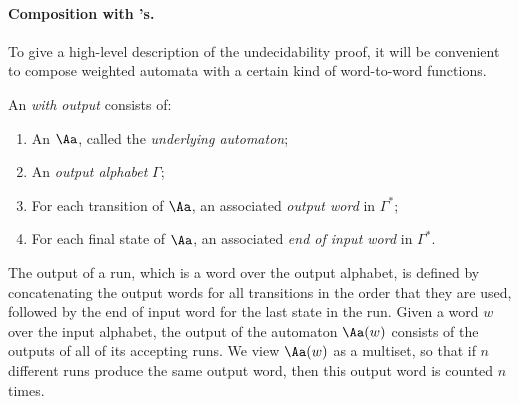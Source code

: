 %
%
\paragraph*{Composition with \nfa's.} 
To give a high-level description of the undecidability proof, it will be convenient to compose weighted automata with a certain kind of word-to-word functions.

\begin{definition}\label{def:nfa-with-output}
 An \emph{\nfa with output} consists of:
 \begin{enumerate}
 	\item An  \nfa $\Aa$, called the \emph{underlying automaton};
 	\item An \emph{output alphabet} $\Gamma$;
 	\item For each transition of $\Aa$, an associated \emph{output word} in $\Gamma^*$;
  	\item For each final state of $\Aa$, an associated \emph{end of input word} in $\Gamma^*$.
 \end{enumerate}
\end{definition}
  The output of a run, which is a word over the output alphabet, is defined by concatenating  the output words for all transitions in the order that they are used, followed by the end of input word for  the last state in the run. Given a word $w$ over the input alphabet, the output of the automaton $\Aa(w)$ consists of  the outputs  of all of its accepting runs. We  view $\Aa(w)$ as a multiset, so that if $n$ different runs produce the same output word, then this output word is counted $n$ times. 



